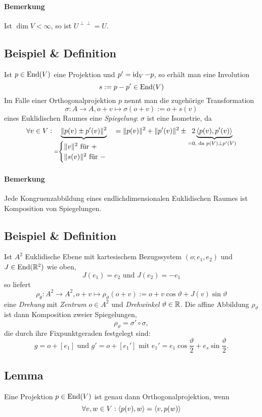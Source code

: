 \paragraph{Bemerkung}
	Ist $ \dim V < \infty $, so ist $ U^{\perp\perp} = U$.

\subsection{Beispiel \& Definition}
	Ist $ p\in \operatorname{End}(V) $ eine Projektion und $ p' = \operatorname{id}_V -p $, so erhält man eine Involution
		\[ s := p-p' \in \operatorname{End}(V) \]
	Im Falle einer Orthogonalprojektion $ p $ nennt man die zugehörige Transformation	
		\[ \sigma: A\to A, o+v\mapsto \sigma(o+v):= o+s(v) \]
	eines Euklidischen Raumes eine \emph{Spiegelung}: $ \sigma $ ist eine Isometrie, da
		\[ \forall v\in V: \underset{ = \begin{cases}
			\|v\|^2 \text{ für }+\\ \|s(v)\|^2 \text{ für } -
			\end{cases}}{\underbrace{\|p(v)\pm p'(v)\|^2}} = \|p(v)\|^2+\|p'(v)\|^2 \pm \underset{ = 0\text{, da }p(V)\perp p'(V)}{2\underbrace{\langle p(v),p'(v) \rangle}} \]
\paragraph{Bemerkung}
	Jede Kongruenzabbildung eines endlichdimensionalen Euklidischen Raumes ist Komposition von Spiegelungen.

\subsection{Beispiel \& Definition}
	Ist $ A^2 $ Euklidische Ebene mit kartesischem Bezugssystem $ (o;e_1,e_2) $ und $ J\in \operatorname{End}(\mathbb{R}^2) $ wie oben,
		\[ J(e_1) = e_2 \text{ und } J(e_2) = -e_1 \]
	so liefert 
		\[ \rho_\theta : A^2\to A^2, o+v\mapsto \rho_\vartheta(o+v):= o+v\cos \vartheta + J(v)\sin\vartheta \]
	eine \emph{Drehung} mit \emph{Zentrum} $ o\in A^2 $ und \emph{Drehwinkel} $ \vartheta \in \mathbb{R} $. Die affine Abbildung $ \rho_\vartheta $ ist dann Komposition zweier Spiegelungen, 
		\[ \rho_\vartheta= \sigma'\circ \sigma, \]
	die durch ihre Fixpunktgeraden festgelegt sind:
		\[ g = o + [e_1] \text{ und }g' = o+[e_1'] \text{ mit } e_1' = e_1 \cos\frac{\vartheta}{2}+e_s\sin \frac{\vartheta}{2}. \]
	

\subsection{Lemma}
\begin{Lemma}
	Eine Projektion $ p\in \operatorname{End}(V) $ ist genau dann Orthogonalprojektion, wenn
		\[ \forall v,w\in V: \langle p(v),w \rangle = \langle v,p(w) \rangle \]
\end{Lemma}
